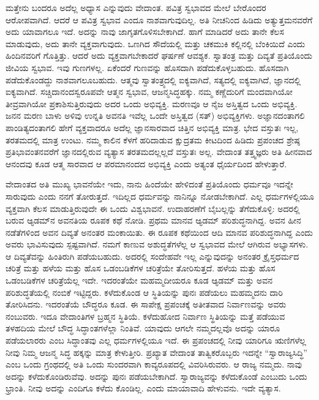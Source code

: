 ಮತ್ತೇನು ಬಂದರೂ ಅದೆಲ್ಲ ಅಧ್ಯಾಸ ಎನ್ನುವುದು ವೇದಾಂತ. ಪವಿತ್ರ ಸ್ವಭಾವದ ಮೇಲೆ ಬೇರೊಂದರ ಆರೋಪವಾಗಿದೆ. ಆದರೆ ಆ ಪವಿತ್ರ ಸ್ವಭಾವ ಎಂದೂ ನಾಶವಾಗುವುದಿಲ್ಲ. ಅತಿ ನೀಚನಿಂದ ಹಿಡಿದು ಅತ್ಯುತ್ತಮನವರೆಗೆ ಅದು ಯಾವಾಗಲೂ ಇದೆ. ಅದನ್ನು ನಾವು ಜಾಗೃತಗೊಳಿಸಬೇಕಾಗಿದೆ. ಹಾಗೆ ಮಾಡಿದರೆ ಅದು ತಾನೇ ಕೆಲಸ ಮಾಡುವುದು, ಅದು ತಾನೇ ವ್ಯಕ್ತವಾಗುವುದು. ಒಣಗಿದ ಸೌದೆಯಲ್ಲಿ ಮತ್ತು ಚಕಮುಕಿ ಕಲ್ಲಿನಲ್ಲಿ ಬೆಂಕಿಯಿದೆ ಎಂದು ಹಿಂದಿನವರಿಗೆ ಗೊತ್ತಿತ್ತು. ಆದರೆ ಅದು ವ್ಯಕ್ತವಾಗಬೇಕಾದರೆ ಘರ್ಷಣೆ ಆವಶ್ಯಕ. ಸ್ವಾತಂತ್ರ ಮತ್ತು ದಿವ್ಯತೆ ಪ್ರತಿಯೊಂದು ಜೀವಿಯ ಸ್ವಭಾವ. ಇವು ಗುಣಗಳಲ್ಲ. ಏಕೆಂದರೆ ಗುಣವನ್ನು ಹೊಸದಾಗಿ ಪಡೆದುಕೊಳ್ಳಬಹುದು. ಹೊಸದಾಗಿ ಪಡೆದುಕೊಂಡದ್ದು ನಾಶವಾಗಲೂಬಹುದು. ಆತ್ಮವು ಸ್ವಾತಂತ್ರ್ಯದಲ್ಲಿ ಐಕ್ಯವಾಗಿದೆ, ಸತ್ಯದಲ್ಲಿ ಐಕ್ಯವಾಗಿದೆ, ಜ್ಞಾನದಲ್ಲಿ ಐಕ್ಯವಾಗಿದೆ. ಸಚ್ಚಿದಾನಂದಸ್ವರೂಪವೇ ಆತ್ಮನ ಸ್ವಭಾವ, ಆಜನ್ಮಸಿದ್ಧಹಕ್ಕು. ನಮ್ಮ ಕಣ್ಣೆದುರಿಗೆ ಮಂದವಾಗಿಯೋ ತೀವ್ರವಾಗಿಯೋ ಪ್ರಕಾಶಿಸುತ್ತಿರುವುದು ಅದರ ಒಂದು ಅಭಿವ್ಯಕ್ತಿ. ಮರಣವೂ ಆ ನೈಜ ಅಸ್ತಿತ್ವದ ಒಂದು ಅಭಿವ್ಯಕ್ತಿ. ಜನನ ಮರಣ ಬಾಳು ಅಳಿವು ಉನ್ನತಿ ಅವನತಿ ಇವೆಲ್ಲ ಒಂದೇ ಅಸ್ತಿತ್ವದ (ಸತ್​) ಅಭಿವ್ಯಕ್ತಿಗಳು. ಅಜ್ಞಾನದಂತಾಗಲಿ ಪಾಂಡಿತ್ಯದಂತಾಗಲಿ ಹೇಗೆ ವ್ಯಕ್ತವಾದರೂ ಅದೆಲ್ಲ ಜ್ಞಾನಸಾರವಾದ ಚಿತ್ತಿನ ಅಭಿವ್ಯಕ್ತಿ ಮಾತ್ರ. ಭೇದ ವಸ್ತುತಃ ಇಲ್ಲ, ತರತಮದಲ್ಲಿ ಮಾತ್ರ ಉಂಟು. ನಮ್ಮ ಕಾಲಿನ ಕೆಳಗೆ ಹರಿದಾಡುವ ಕ್ಷುದ್ರತಮ ಕೀಟದಿಂದ ಹಿಡಿದು ಪ್ರಪಂಚದ ಶ್ರೇಷ್ಠ ಪ್ರತಿಭಾವಂತನವರೆಗೆ ಜ್ಞಾನದಲ್ಲಿರುವ ವ್ಯತ್ಯಾಸ ತರತಮದಲ್ಲಲ್ಲದೆ ವಸ್ತುತಃ ಅಲ್ಲ. ವೇದಾಂತ ತತ್ತ್ವಜ್ಞರು ಅತಿ ಹೀನವಾದ ಆನಂದವು ಕೂಡ ಆತ್ಮ ಸಾರವಾದ ಆ ಪರಮಾನಂದದ ಅಭಿವ್ಯಕ್ತಿ ಎಂದು ಅತ್ಯಂತ ಧೈರ್ಯದಿಂದ ಹೇಳುತ್ತಾರೆ.

\vskip 0.2cm 

ವೇದಾಂತದ ಅತಿ ಮುಖ್ಯ ಭಾವನೆಯೇ ಇದು, ನಾನು ಹಿಂದೆಯೇ ಹೇಳಿದಂತೆ ಪ್ರತಿಯೊಂದು ಧರ್ಮವೂ ಇದನ್ನೇ ಸಾರುವುದು ಎಂದು ನನಗೆ ತೋರುತ್ತದೆ. ಇದಿಲ್ಲದ ಧರ್ಮವನ್ನು ನಾನಿನ್ನೂ ನೋಡಬೇಕಾಗಿದೆ. ಎಲ್ಲ ಧರ್ಮಗಳಲ್ಲಿಯೂ ವ್ಯಕ್ತವಾಗಿ ಕೆಲಸ ಮಾಡುತ್ತಿರುವುದೇ ಈ ಒಂದು ವಿಶ್ವಭಾವನೆ. ಉದಾಹರಣೆಗೆ ಬೈಬಲ್ಲನ್ನು ತೆಗೆದುಕೊಳ್ಳಿ: ಅದರಲ್ಲಿ ಬರುವ ಆ್ಯಡಮ್​ನ ಅವನತಿಯ ರೂಪಕ ಕಥೆ ನೋಡಿ. ಪ್ರಥಮ ಮಾನವ ಆ್ಯಡಮ್​ ಪರಿಶುದ್ಧನಾಗಿದ್ದ. ಅವನ ಹೀನ ನಡೆತೆಗಳಿಂದ ಅವನ ದಿವ್ಯತೆ ಅನಂತರ ಮಂಕಾಯಿತು. ಈ ರೂಪಕ ಕಥೆಯಿಂದ ಆದಿ ಮಾನವ ಪರಿಶುದ್ಧನಾಗಿದ್ದ ಎಂದು ಅವರು ಭಾವಿಸುವುದು ಸ್ಪಷ್ಟವಾಗಿದೆ. ನಮಗೆ ಕಾಣುವ ಅಶುದ್ಧತೆಗಳೆಲ್ಲ ಆ ಸ್ವಭಾವದ ಮೇಲೆ ಆಗಿರುವ ಅಭ್ಯಾಸಗಳು. ಆ ದಿವ್ಯತೆವನ್ನು ಹಿಂತಿರುಗಿ ಪಡೆಯಬಹುದು. ಅದರಲ್ಲಿ ಸಂದೇಹವೇ ಇಲ್ಲ ಎನ್ನುವುದನ್ನು ಅನಂತರ ಕ್ರೈಸ್ತಧರ್ಮದ ಚರಿತ್ರೆ ಮತ್ತು ಹಳೆಯ ಮತ್ತು ಹೊಸ ಒಡಂಬಡಿಕೆಗಳ ಚರಿತ್ರೆಯೇ ತೋರಿಸುತ್ತದೆ. ಹಳೆಯ ಮತ್ತು ಹೊಸ ಒಡಂಬಡಿಕೆಗಳ ಚರಿತ್ರೆಯೆಲ್ಲ ಇದೇ. ಇದರಂತೆಯೇ ಮಹಮ್ಮದೀಯರೂ ಕೂಡ ಆ್ಯಡಮ್​ ಮತ್ತು ಅವನ ಪರಿಶುದ್ಧತೆಯಲ್ಲಿ ನಂಬಿಕೆ ಇಟ್ಟಿದ್ದರು. ಕಳೆದುಕೊಂಡ ಆ ಸ್ಥಿತಿಯನ್ನು ಪುನಃ ಪಡೆಯಲು ಮಹಮ್ಮದನು ದಾರಿ ತೋರಿಸಿದನು. ಇದರಂತೆಯೆ ಬೌದ್ಧರೂ ಕೂಡ. ಈ ಸಾಪೇಕ್ಷ ಪ್ರಪಂಚಕ್ಕೆ ಅತೀತವಾದ ನಿರ್ವಾಣವನ್ನು ಅವರು ನಂಬುವರು. ಇದೂ ವೇದಾಂತಿಗಳ ಬ್ರಹ್ಮನ ಸ್ಥಿತಿಯೆ. ಕಳೆದುಹೋದ ನಿರ್ವಾಣ ಸ್ಥಿತಿಯನ್ನು ಮತ್ತೆ ಪಡೆಯುವ ತಳಹದಿಯ ಮೇಲೆ ಬೌದ್ಧ ಸಿದ್ಧಾಂತಗಳೆಲ್ಲಾ ನಿಂತಿವೆ. ಯಾವುದು ಆಗಲೇ ನಮ್ಮದಲ್ಲವೊ ಅದನ್ನು ಯಾರೂ ಪಡೆಯಲಾರರು ಎಂಬ ಸಿದ್ಧಾಂತವು ಎಲ್ಲ ಧರ್ಮಗಳಲ್ಲಿಯೂ ಇದೆ. ಈ ಪ್ರಪಂಚದಲ್ಲಿ ನೀವು ಯಾರಿಗೂ ಋಣಿಗಳೆಲ್ಲ ನೀವು ನಿಮ್ಮ ಆಜನ್ಮ ಸಿದ್ಧ ಹಕ್ಕನ್ನು ಮಾತ್ರ ಕೇಳುತ್ತೀರಿ. ಪ್ರಖ್ಯಾತ ವೇದಾಂತ ತಾತ್ವಿಕರೊಬ್ಬರು ಇದನ್ನೇ “ಸ್ವಾರಾಜ್ಯಸಿದ್ಧಿ” ಎಂಬ ಒಂದು ಗ್ರಂಥದಲ್ಲಿ ಅತಿ ಒಂದು ಸುಂದರವಾಗಿ ಕಾವ್ಯರೂಪದಲ್ಲಿ ವಿವರಿಸಿರುವರು. ಆ ರಾಜ್ಯ ನಮ್ಮದು. ನಾವು ಅದನ್ನು ಕಳೆದುಕೊಂಡಿರುವೆವು. ಅದನ್ನು ಪುನಃ ಪಡೆಯಬೇಕಾಗಿದೆ. ಸ್ವಾರಾಜ್ಯವನ್ನು ಕಳೆದುಕೊಂಡೆ ಎಂಬುದು ಒಂದು ಭ್ರಾಂತಿ. ನೀವು ಅದನ್ನು ಎಂದಿಗೂ ಕಳೆದು ಕೊಂಡಿಲ್ಲ. ಎಂದು ಮಾಯಾವಾದಿ ಹೇಳುವನು. ಇದೇ ವ್ಯತ್ಯಾಸ.

